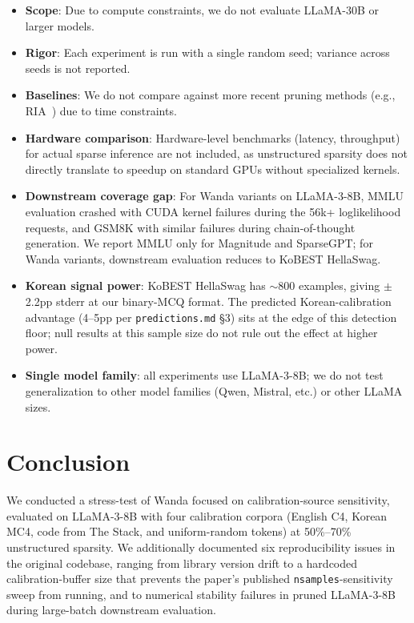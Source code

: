 \documentclass{article}
\begin{document}
\begin{itemize}
  \item \textbf{Scope}: Due to compute constraints, we do not evaluate
        LLaMA-30B or larger models.
  \item \textbf{Rigor}: Each experiment is run with a single random seed;
        variance across seeds is not reported.
  \item \textbf{Baselines}: We do not compare against more recent pruning
        methods (e.g., RIA~\cite{ria}) due to time constraints.
  \item \textbf{Hardware comparison}: Hardware-level benchmarks (latency,
        throughput) for actual sparse inference are not included, as
        unstructured sparsity does not directly translate to speedup on
        standard GPUs without specialized kernels.
  \item \textbf{Downstream coverage gap}: For Wanda variants on LLaMA-3-8B,
        MMLU evaluation crashed with CUDA kernel failures during the 56k+
        loglikelihood requests, and GSM8K with similar failures during
        chain-of-thought generation. We report MMLU only for Magnitude and
        SparseGPT; for Wanda variants, downstream evaluation reduces to
        KoBEST HellaSwag.
  \item \textbf{Korean signal power}: KoBEST HellaSwag has $\sim$800
        examples, giving $\pm$2.2pp stderr at our binary-MCQ format.
        The predicted Korean-calibration advantage (4--5pp per
        \texttt{predictions.md} \S3) sits at the edge of this detection
        floor; null results at this sample size do not rule out the
        effect at higher power.
  \item \textbf{Single model family}: all experiments use LLaMA-3-8B;
        we do not test generalization to other model families (Qwen,
        Mistral, etc.) or other LLaMA sizes.
\end{itemize}

\section{Conclusion}

We conducted a stress-test of Wanda focused on calibration-source
sensitivity, evaluated on LLaMA-3-8B with four calibration corpora
(English C4, Korean MC4, code from The Stack, and uniform-random tokens)
at 50\%--70\% unstructured sparsity. We additionally documented six
reproducibility issues in the original codebase, ranging from library
version drift to a hardcoded calibration-buffer size that prevents the
paper's published \texttt{nsamples}-sensitivity sweep from running, and
to numerical stability failures in pruned LLaMA-3-8B during large-batch
downstream evaluation.
\end{document}
